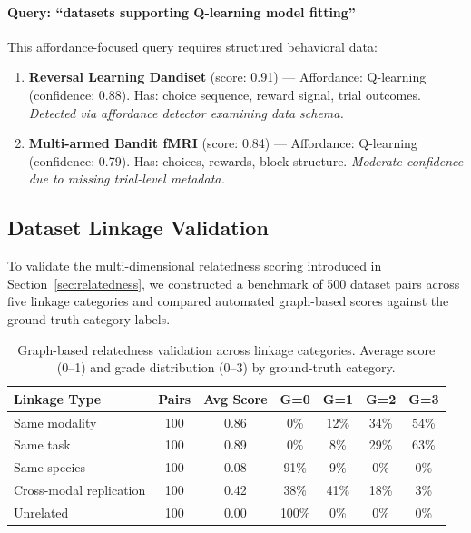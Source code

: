 \documentclass{article}
\theoremstyle{definition}
\begin{document}
\paragraph{Query: ``datasets supporting Q-learning model fitting''}

This affordance-focused query requires structured behavioral data:

\begin{enumerate}
    \item \textbf{Reversal Learning Dandiset} (score: 0.91) --- Affordance: Q-learning (confidence: 0.88). Has: choice sequence, reward signal, trial outcomes. \textit{Detected via affordance detector examining data schema.}

    \item \textbf{Multi-armed Bandit fMRI} (score: 0.84) --- Affordance: Q-learning (confidence: 0.79). Has: choices, rewards, block structure. \textit{Moderate confidence due to missing trial-level metadata.}
\end{enumerate}

\subsection{Dataset Linkage Validation}
\label{sec:validation}

To validate the multi-dimensional relatedness scoring introduced in Section~\ref{sec:relatedness}, we constructed a benchmark of 500 dataset pairs across five linkage categories and compared automated graph-based scores against the ground truth category labels.

\begin{table}[t]
\centering
\small
\caption{Graph-based relatedness validation across linkage categories. Average score (0--1) and grade distribution (0--3) by ground-truth category.}
\label{tab:linkage-validation}
\begin{tabular}{lcccccc}
\toprule
\textbf{Linkage Type} & \textbf{Pairs} & \textbf{Avg Score} & \textbf{G=0} & \textbf{G=1} & \textbf{G=2} & \textbf{G=3} \\
\midrule
Same modality & 100 & 0.86 & 0\% & 12\% & 34\% & 54\% \\
Same task & 100 & 0.89 & 0\% & 8\% & 29\% & 63\% \\
Same species & 100 & 0.08 & 91\% & 9\% & 0\% & 0\% \\
Cross-modal replication & 100 & 0.42 & 38\% & 41\% & 18\% & 3\% \\
Unrelated & 100 & 0.00 & 100\% & 0\% & 0\% & 0\% \\
\bottomrule
\end{tabular}
\end{table}
\end{document}
